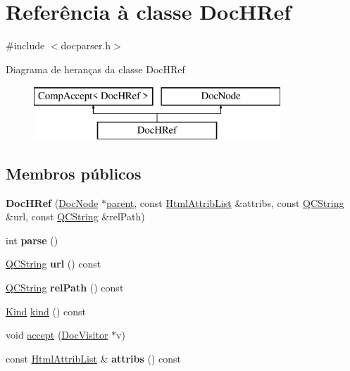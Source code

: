 \hypertarget{class_doc_h_ref}{\section{Referência à classe Doc\-H\-Ref}
\label{class_doc_h_ref}
}


{\ttfamily \#include $<$docparser.\-h$>$}

Diagrama de heranças da classe Doc\-H\-Ref\begin{figure}[H]
\begin{center}
\leavevmode
\includegraphics[height=2.000000cm]{class_doc_h_ref}
\end{center}
\end{figure}
\subsection*{Membros públicos}
\begin{DoxyCompactItemize}
\item 
\hypertarget{class_doc_h_ref_a0b5093a843abebf6e61128699e544535}{{\bfseries Doc\-H\-Ref} (\hyperlink{class_doc_node}{Doc\-Node} $\ast$\hyperlink{class_doc_node_abd7f070d6b0a38b4da71c2806578d19d}{parent}, const \hyperlink{class_html_attrib_list}{Html\-Attrib\-List} \&attribs, const \hyperlink{class_q_c_string}{Q\-C\-String} \&url, const \hyperlink{class_q_c_string}{Q\-C\-String} \&rel\-Path)}\label{class_doc_h_ref_a0b5093a843abebf6e61128699e544535}

\item 
\hypertarget{class_doc_h_ref_a67007fc2be130666fbf3b065022756f4}{int {\bfseries parse} ()}\label{class_doc_h_ref_a67007fc2be130666fbf3b065022756f4}

\item 
\hypertarget{class_doc_h_ref_a33ca03a1959afc82bd99d7c515a9f599}{\hyperlink{class_q_c_string}{Q\-C\-String} {\bfseries url} () const }\label{class_doc_h_ref_a33ca03a1959afc82bd99d7c515a9f599}

\item 
\hypertarget{class_doc_h_ref_a3aa6799d4713d51d9cc4862af165671c}{\hyperlink{class_q_c_string}{Q\-C\-String} {\bfseries rel\-Path} () const }\label{class_doc_h_ref_a3aa6799d4713d51d9cc4862af165671c}

\item 
\hyperlink{class_doc_node_aa10c9e8951b8ccf714a59ec321bdac5b}{Kind} \hyperlink{class_doc_h_ref_aa9d037bed9f9a083d0cd01485637d843}{kind} () const 
\item 
void \hyperlink{class_doc_h_ref_a7ba716e854ae2f8f87a4eb2140e302b6}{accept} (\hyperlink{class_doc_visitor}{Doc\-Visitor} $\ast$v)
\item 
\hypertarget{class_doc_h_ref_aae3c838ea3d3273b35d07e9965a8985e}{const \hyperlink{class_html_attrib_list}{Html\-Attrib\-List} \& {\bfseries attribs} () const }\label{class_doc_h_ref_aae3c838ea3d3273b35d07e9965a8985e}

\end{DoxyCompactItemize}
